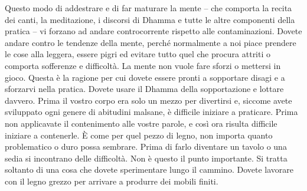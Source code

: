Questo modo di addestrare e di far maturare la mente -- che comporta la
recita dei canti, la meditazione, i discorsi di Dhamma e tutte le altre
componenti della pratica -- vi forzano ad andare controcorrente rispetto
alle contaminazioni. Dovete andare contro le tendenze della mente,
perché normalmente a noi piace prendere le cose alla leggera, essere
pigri ed evitare tutto quel che procura attriti o comporta sofferenze e
difficoltà. La mente non vuole fare sforzi o mettersi in gioco. Questa è
la ragione per cui dovete essere pronti a sopportare disagi e a
sforzarvi nella pratica. Dovete usare il Dhamma della sopportazione e
lottare davvero. Prima il vostro corpo era solo un mezzo per divertirsi
e, siccome avete sviluppato ogni genere di abitudini malsane, è
difficile iniziare a praticare. Prima non applicavate il contenimento
alle vostre parole, e così ora risulta difficile iniziare a contenerle.
È come per quel pezzo di legno, non importa quanto problematico o duro
possa sembrare. Prima di farlo diventare un tavolo o una sedia si
incontrano delle difficoltà. Non è questo il punto importante. Si tratta
soltanto di una cosa che dovete sperimentare lungo il cammino. Dovete
lavorare con il legno grezzo per arrivare a produrre dei mobili finiti.

